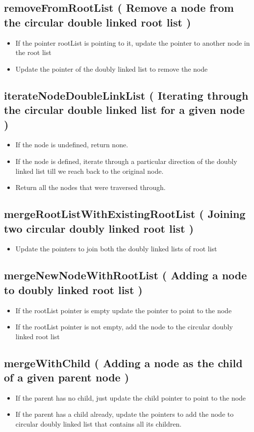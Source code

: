 \subsection{removeFromRootList ( Remove a node from the circular double linked root list )}
		\begin{itemize}
			\item If the pointer rootList is pointing to it, update the pointer to another node in the root list
			\item Update the pointer of the doubly linked list to remove the node
		\end{itemize}
\subsection{iterateNodeDoubleLinkList ( Iterating through the circular double linked list for a given node )}
		\begin{itemize}
			\item If the node is undefined, return none.
			\item If the node is defined, iterate through a particular direction of the doubly linked list till we reach back to the original node. 
			\item Return all the nodes that were traversed through.
		\end{itemize}
\subsection{mergeRootListWithExistingRootList ( Joining two circular doubly linked root list )}
		\begin{itemize}
			\item Update the pointers to join both the doubly linked lists of root list
		\end{itemize}
\subsection{mergeNewNodeWithRootList ( Adding a node to doubly linked root list )}
		\begin{itemize}
			\item If the rootList pointer is empty update the pointer to point to the node
			\item If the rootList pointer is not empty, add the node to the circular doubly linked root list
		\end{itemize}
\subsection{mergeWithChild ( Adding a node as the child of a given parent node )}
		\begin{itemize}
			\item If the parent has no child, just update the child pointer to point to the node
			\item If the parent has a child already, update the pointers to add the node to circular doubly linked list that contains all its children.
		\end{itemize}
